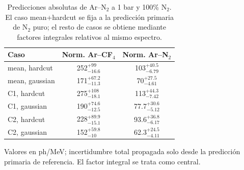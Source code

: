 \begin{table}[htbp]
\centering
\caption{Predicciones absolutas de Ar--N$_2$ a 1 bar y 100\% N$_2$. El caso mean+hardcut se fija a la predicción primaria de N$_2$ puro; el resto de casos se obtiene mediante factores integrales relativos al mismo espectro.}
\label{tab:arn2_six_cases_scaled_to_n2_mean_hardcut_primary_norms}
\begin{tabular}{lcc}
\toprule
Caso & Norm. Ar--CF$_4$ & Norm. Ar--N$_2$ \\
\midrule
mean, hardcut & \num{252}$^{+\num{99}}_{-\num{16.6}}$ & \num{103}$^{+\num{40.5}}_{-\num{6.79}}$ \\
mean, gaussian & \num{171}$^{+\num{67.2}}_{-\num{11.3}}$ & \num{70}$^{+\num{27.5}}_{-\num{4.61}}$ \\
C1, hardcut & \num{275}$^{+\num{108}}_{-\num{18.1}}$ & \num{113}$^{+\num{44.3}}_{-\num{7.42}}$ \\
C1, gaussian & \num{190}$^{+\num{74.6}}_{-\num{12.5}}$ & \num{77.7}$^{+\num{30.6}}_{-\num{5.12}}$ \\
C2, hardcut & \num{228}$^{+\num{89.9}}_{-\num{15.1}}$ & \num{93.6}$^{+\num{36.8}}_{-\num{6.17}}$ \\
C2, gaussian & \num{152}$^{+\num{59.8}}_{-\num{10}}$ & \num{62.3}$^{+\num{24.5}}_{-\num{4.11}}$ \\
\bottomrule
\end{tabular}
\par\vspace{0.35em}\footnotesize{Valores en ph/MeV; incertidumbre total propagada solo desde la predicción primaria de referencia. El factor integral se trata como central.}
\end{table}
